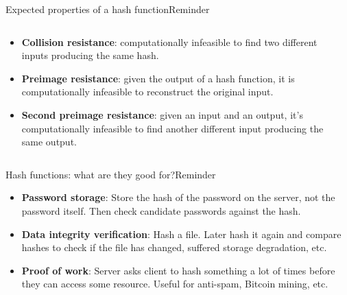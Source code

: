 \documentclass[aspectratio=169, lualatex, handout]{beamer}
\begin{document}
\begin{frame}{Expected properties of a hash function}{Reminder}
	\begin{columns}[c]
		\begin{column}{0.6\textwidth}
			\begin{itemize}[<+->]
				\item \textbf{Collision resistance}: computationally infeasible to find
				      two different inputs producing the same hash.
				\item \textbf{Preimage resistance}: given the output of a hash function,
				      it is computationally infeasible to reconstruct the original input.
				\item \textbf{Second preimage resistance}: given an input and an output,
				      it's computationally infeasible to find another different input
				      producing the same output.
			\end{itemize}
		\end{column}
		\begin{column}{0.4\textwidth}
		\end{column}
	\end{columns}
\end{frame}

\begin{frame}{Hash functions: what are they good for?}{Reminder}
	\begin{itemize}[<+->]
		\item \textbf{Password storage}: Store the hash of the password on the server,
		      not the password itself. Then check candidate passwords against the hash.
		\item \textbf{Data integrity verification}: Hash a file. Later hash it
		      again and compare hashes to check if the file has changed, suffered storage
		      degradation, etc.
		\item \textbf{Proof of work}: Server asks client to hash something a lot of
		      times before they can access some resource. Useful for anti-spam, Bitcoin
		      mining, etc.
	\end{itemize}
\end{frame}
\end{document}
